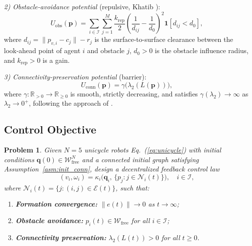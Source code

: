\documentclass[letterpaper, 10 pt, journal, twoside]{IEEEtran}
\newcommand{\R}{\mathbb{R}}
\newtheorem{problem}{Problem}
\def\scr#1{{\mathcal #1}}
\newcommand{\eqnref}[1]{Eq.~(\ref{#1})}
\newcommand{\asmref}[1]{Assumption~\ref{#1}}
\begin{document}
\textit{2) Obstacle-avoidance potential} (repulsive, Khatib \cite{khatib1986IJRR}):
\begin{equation}
  U_{\mathrm{obs}}(\mathbf{p})=\sum_{i\in\scr{I}}\sum_{j=1}^{M}
  \frac{k_{\mathrm{rep}}}{2}
  \!\left(\frac{1}{d_{ij}}-\frac{1}{d_{0}}\right)^{\!2}
  \mathbf{1}[d_{ij}<d_{0}],
  \label{eq:U_obs}
\end{equation}
where $d_{ij}=\|p_{v,i}-c_{j}\|-r_{j}$ is the surface-to-surface clearance
between the look-ahead point of agent $i$ and obstacle $j$, $d_{0}>0$ is the
obstacle influence radius, and $k_{\mathrm{rep}}>0$ is a gain.

\textit{3) Connectivity-preservation potential} (barrier):
\begin{equation}
  U_{\mathrm{conn}}(\mathbf{p})=\gamma\!\bigl(\lambda_{2}(L(\mathbf{p}))\bigr),
  \label{eq:U_conn}
\end{equation}
where $\gamma:\R_{>0}\to\R_{\geq 0}$ is smooth, strictly decreasing, and
satisfies $\gamma(\lambda_{2})\to\infty$ as $\lambda_{2}\to 0^{+}$, following
the approach of \cite{panagou2016ITAC}.

\subsection{Control Objective}

\begin{problem}
\label{prob:main}
Given $N=5$ unicycle robots \eqnref{eq:unicycle} with initial conditions
$\mathbf{q}(0)\in\scr{W}_{\mathrm{free}}^{N}$ and a connected initial graph
satisfying \asmref{asm:init_conn}, design a decentralized feedback
control law
\begin{equation}
  (v_{i},\omega_{i})=\kappa_{i}\!\bigl(\mathbf{q}_{i},\,
  \{p_{j}:j\in\scr{N}_{i}(t)\}\bigr), \quad i\in\scr{I},
  \label{eq:control_law}
\end{equation}
where $\scr{N}_{i}(t)=\{j:(i,j)\in\scr{E}(t)\}$, such that:
\begin{enumerate}
  \item \textbf{Formation convergence:}
        $\|e(t)\|\to 0$ as $t\to\infty$;
  \item \textbf{Obstacle avoidance:}
        $p_{i}(t)\in\scr{W}_{\mathrm{free}}$ for all $i\in\scr{I}$;
  \item \textbf{Connectivity preservation:}
        $\lambda_{2}(L(t))>0$ for all $t\geq 0$.
\end{enumerate}
\end{problem}
\end{document}
